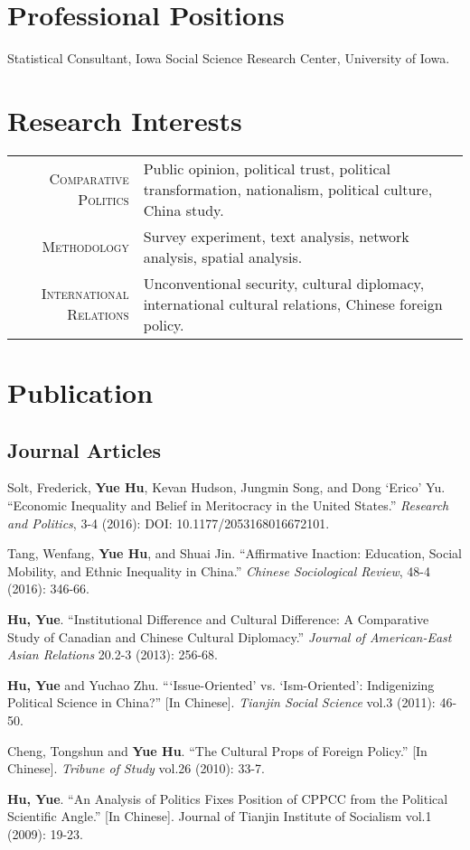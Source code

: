 \documentclass[a4paper,10pt]{article} %
\renewenvironment{itemize}{
	\begin{list}{}{
			\setlength{\leftmargin}{1.5em}
		}
	}{
\end{list}
}
\begin{document}
\section{Professional Positions}
		 Statistical Consultant, Iowa Social Science Research Center, University of Iowa.




\section{Research Interests}
	\begin{tabular}{rp{}}
		\textsc{Comparative Politics} & Public opinion, political trust, political transformation, nationalism, political culture, China study. \\[5pt]
		\textsc{Methodology} & Survey experiment, text analysis, network analysis, spatial analysis. \\[5pt]
		\textsc{International Relations} & Unconventional security, cultural diplomacy, international cultural relations, Chinese foreign policy. 
	\end{tabular}


\section{Publication}
	\subsection*{Journal Articles}
		\begin{itemize}
			\item Solt, Frederick, \textbf{Yue Hu}, Kevan Hudson, Jungmin Song, and Dong `Erico' Yu. ``Economic Inequality and Belief in Meritocracy in the United States.'' \textit{Research and Politics}, 3-4 (2016): DOI: 10.1177/2053168016672101.
			\item Tang, Wenfang, \textbf{Yue Hu}, and Shuai Jin. ``Affirmative Inaction: Education, Social Mobility, and Ethnic Inequality in China.'' \textit{Chinese Sociological Review}, 48-4 (2016): 346-66.
			\item \textbf{Hu, Yue}. ``Institutional Difference and Cultural Difference: A Comparative Study of Canadian and Chinese Cultural Diplomacy.'' \textit{Journal of American-East Asian Relations} 20.2-3 (2013): 256-68.
			\item \textbf{Hu, Yue} and Yuchao Zhu. ```Issue-Oriented' vs. `Ism-Oriented': Indigenizing Political Science in China?'' [In Chinese]. \textit{Tianjin Social Science} vol.3 (2011): 46-50.
			\item Cheng, Tongshun and \textbf{Yue Hu}. ``The Cultural Props of Foreign Policy.'' [In Chinese]. \textit{Tribune of Study} vol.26 (2010): 33-7.
			\item \textbf{Hu, Yue}. ``An Analysis of Politics Fixes Position of CPPCC from the Political Scientific Angle.'' [In Chinese]. Journal of Tianjin Institute of Socialism vol.1 (2009): 19-23.
		\end{itemize}
	
\end{document}
